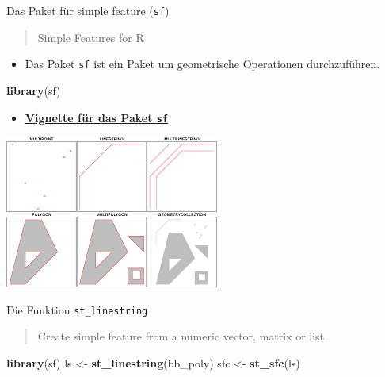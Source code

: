 \documentclass[ignorenonframetext,]{beamer}
\newenvironment{Shaded}{\begin{snugshade}}{\end{snugshade}}
\newcommand{\KeywordTok}[1]{\textcolor[rgb]{0.13,0.29,0.53}{\textbf{#1}}}
\newcommand{\NormalTok}[1]{#1}
\newcommand{\StringTok}[1]{\textcolor[rgb]{0.31,0.60,0.02}{#1}}
\providecommand{\tightlist}{%
  \setlength{\itemsep}{0pt}\setlength{\parskip}{0pt}}
\begin{document}
\begin{frame}[fragile]{Das Paket für simple feature (\texttt{sf})}
\protect\hypertarget{das-paket-fur-simple-feature-sf}{}

\begin{quote}
Simple Features for R
\end{quote}

\begin{itemize}
\tightlist
\item
  Das Paket \texttt{sf} ist ein Paket um geometrische Operationen
  durchzuführen.
\end{itemize}

\begin{Shaded}
\begin{Highlighting}[]
\KeywordTok{library}\NormalTok{(sf)}
\end{Highlighting}
\end{Shaded}

\begin{itemize}
\tightlist
\item
  \href{https://cran.r-project.org/web/packages/sf/vignettes/sf3.html}{\textbf{Vignette
  für das Paket \texttt{sf}}}
\end{itemize}

\includegraphics{figure/rsimplefeatures.png}

\end{frame}

\begin{frame}[fragile]{Die Funktion \texttt{st\_linestring}}
\protect\hypertarget{die-funktion-st_linestring}{}

\begin{quote}
Create simple feature from a numeric vector, matrix or list
\end{quote}

\begin{Shaded}
\begin{Highlighting}[]
\KeywordTok{library}\NormalTok{(sf)}
\NormalTok{ls <-}\StringTok{ }\KeywordTok{st_linestring}\NormalTok{(bb_poly)}
\NormalTok{sfc <-}\StringTok{ }\KeywordTok{st_sfc}\NormalTok{(ls)}
\end{Highlighting}
\end{Shaded}

\end{frame}
\end{document}
